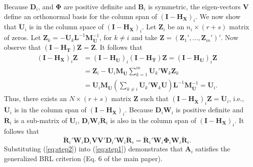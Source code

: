 \documentclass[12pt]{article}
\begin{document}
Because \(\mathbf{D}_i\), and \(\boldsymbol\Phi\) are positive definite
and \(\mathbf{B}_i\) is symmetric, the eigen-vectors \(\mathbf{V}\)
define an orthonormal basis for the column span of
\(\left(\mathbf{I} - \mathbf{H_X}\right)_i\). We now show that
\(\mathbf{\ddot{U}}_i\) is in the column space of
\(\left(\mathbf{I} - \mathbf{H_X}\right)_i\). Let \(\mathbf{Z}_i\) be an
\(n_i \times (r + s)\) matrix of zeros. Let
\(\mathbf{Z}_k = - \mathbf{\ddot{U}}_k \mathbf{L}^{-1}\mathbf{M}_{\mathbf{\ddot{U}}}^{-1}\),
for \(k \neq i\) and take
\(\mathbf{Z} = \left(\mathbf{Z}_1',...,\mathbf{Z}_m'\right)'\). Now
observe that
\(\left(\mathbf{I} - \mathbf{H_T}\right) \mathbf{Z} = \mathbf{Z}\). It
follows that \begin{align*}
\left(\mathbf{I} - \mathbf{H_X}\right)_i \mathbf{Z} &= \left(\mathbf{I} - \mathbf{H_{\ddot{U}}}\right)_i \left(\mathbf{I} - \mathbf{H_T}\right) \mathbf{Z} = \left(\mathbf{I} - \mathbf{H_{\ddot{U}}}\right)_i \mathbf{Z} \\
&= \mathbf{Z}_i - \mathbf{\ddot{U}}_i\mathbf{M_{\ddot{U}}}\sum_{k=1}^m \mathbf{\ddot{U}}_k'\mathbf{W}_k\mathbf{Z}_k \\
&= \mathbf{\ddot{U}}_i\mathbf{M_{\ddot{U}}} \left(\sum_{k \neq i} \mathbf{\ddot{U}}_k' \mathbf{W}_k \mathbf{\ddot{U}} \right) \mathbf{L}^{-1}\mathbf{M}_{\mathbf{\ddot{U}}}^{-1} = \mathbf{\ddot{U}}_i.
\end{align*} Thus, there exists an \(N \times (r + s)\) matrix
\(\mathbf{Z}\) such that
\(\left(\mathbf{I} - \mathbf{H_{\ddot{X}}}\right)_i \mathbf{Z} = \mathbf{\ddot{U}}_i\),
i.e., \(\mathbf{\ddot{U}}_i\) is in the column span of
\(\left(\mathbf{I} - \mathbf{H_X}\right)_i\). Because
\(\mathbf{D}_i \mathbf{W}_i\) is positive definite and
\(\mathbf{\ddot{R}}_i\) is a sub-matrix of \(\mathbf{\ddot{U}}_i\),
\(\mathbf{D}_i\mathbf{W}_i\mathbf{\ddot{R}}_i\) is also in the column
span of \(\left(\mathbf{I} - \mathbf{H_X}\right)_i\). It follows that
\begin{equation}
\label{eq:step2}
\mathbf{\ddot{R}}_i' \mathbf{W}_i \mathbf{D}_i \mathbf{V}\mathbf{V}' \mathbf{D}_i' \mathbf{W}_i \mathbf{\ddot{R}}_i = \mathbf{\ddot{R}}_i' \mathbf{W}_i \boldsymbol\Phi_i \mathbf{W}_i \mathbf{\ddot{R}}_i.
\end{equation} Substituting (\ref{eq:step2}) into (\ref{eq:step1})
demonstrates that \(\mathbf{A}_i\) satisfies the generalized BRL
criterion (Eq. 6 of the main paper).
\end{document}
